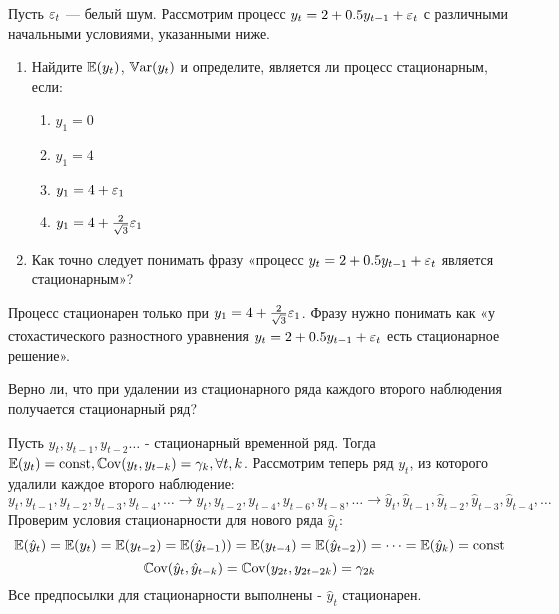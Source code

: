 \begin{problem}
Пусть $\varepsilon_t$ — белый шум. Рассмотрим процесс $y_t=2+0.5y_{t-1}+\varepsilon_t$ с различными начальными условиями, указанными ниже.

\begin{enumerate}
\item Найдите $\operatorname{\mathbb{E}}(y_t)$, $\operatorname{\mathbb{V}\mathrm{ar}}(y_t)$ и определите, является ли процесс  стационарным, если:
\begin{enumerate}
\item $y_1=0$
\item $y_1=4$
\item $y_1=4+\varepsilon_1$
\item $y_1=4+\frac{2}{\sqrt{3}}\varepsilon_1$
\end{enumerate}
\item Как точно следует понимать фразу «процесс $y_t=2+0.5y_{t-1}+\varepsilon_t$ является стационарным»?
\end{enumerate}




\begin{sol}
Процесс стационарен только при $y_1=4+\frac{2}{\sqrt{3}}\varepsilon_1$. Фразу нужно понимать как «у стохастического разностного уравнения $y_t=2+0.5y_{t-1}+\varepsilon_t$ есть стационарное решение».
\end{sol}
\end{problem}




\begin{problem}
Верно ли, что при удалении из стационарного ряда каждого второго наблюдения получается стационарный ряд?


\begin{sol}
Пусть $y_t, y_{t-1}, y_{t-2} \dots $ - стационарный временной ряд. Тогда 
$
\operatorname{\mathbb{E}}(y_t) = \text{const}, \operatorname{\mathbb{C}\mathrm{ov}}(y_t, y_{t-k}) = \gamma_k,  \forall t,k
$. Рассмотрим теперь ряд $y_t$, из которого удалили каждое второго наблюдение: 
\[
y_t, y_{t-1}, y_{t-2}, y_{t-3}, y_{t-4}, \dots \rightarrow y_t, y_{t-2}, y_{t-4}, y_{t-6}, y_{t-8}, \dots \rightarrow \hat{y}_t, \hat{y}_{t-1}, \hat{y}_{t-2}, \hat{y}_{t-3}, \hat{y}_{t-4}, \dots
\]
Проверим условия стационарности для нового ряда $\hat{y}_t$:
\[
\operatorname{\mathbb{E}}(\hat{y}_t) = \operatorname{\mathbb{E}}(y_t) = \operatorname{\mathbb{E}}(y_{t-2}) = \operatorname{\mathbb{E}}(\hat{y}_{t-1})) = \operatorname{\mathbb{E}}(y_{t-4}) = \operatorname{\mathbb{E}}(\hat{y}_{t-2})) = \dots = \operatorname{\mathbb{E}}(\hat{y}_k) = \text{const} 
\]
\[
\operatorname{\mathbb{C}\mathrm{ov}}(\hat{y}_t, \hat{y}_{t-k}) = \operatorname{\mathbb{C}\mathrm{ov}}(y_{2t}, y_{2t-2k}) = \gamma_{2k} 
\]
Все предпосылки для стационарности выполнены - $\hat{y}_t$ стационарен.
\end{sol}
\end{problem}



